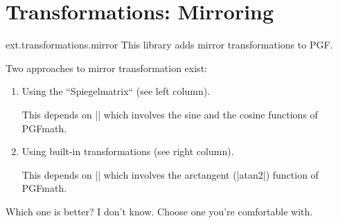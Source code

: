 %
%
%

\section{Transformations: Mirroring}
\label{pgflibrary:transformations}

\begin{purepgflibrary}{ext.transformations.mirror}
  This library adds mirror transformations to PGF.
\end{purepgflibrary}

Two approaches to mirror transformation exist:
\begin{enumerate}
\item Using the ``Spiegelmatrix`` (see left column).

  This depends on |\pgfpointnormalised| which involves the sine and the cosine functions of PGFmath.

\item Using built-in transformations (see right column).

  This depends on |\pgfmathanglebetween| which involves the arctangent (|atan2|) function of PGFmath.
\end{enumerate}

Which one is better? I don't know.
Choose one you're comfortable with.

